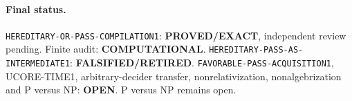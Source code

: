 \documentclass[11pt]{article}
\newcommand{\EXACT}{\textbf{PROVED/EXACT}}
\newcommand{\OPEN}{\textbf{OPEN}}
\newcommand{\RETIRED}{\textbf{FALSIFIED/RETIRED}}
\newcommand{\COMP}{\textbf{COMPUTATIONAL}}
\begin{document}
\paragraph{Final status.}
\texttt{HEREDITARY-OR-PASS-COMPILATION1}: \EXACT, independent review pending.
Finite audit: \COMP.
\texttt{HEREDITARY-PASS-AS-INTERMEDIATE1}: \RETIRED.
\texttt{FAVORABLE-PASS-ACQUISITION1}, UCORE-TIME1, arbitrary-decider
transfer, nonrelativization, nonalgebrization and P versus NP: \OPEN.
P versus NP remains open.

\end{document}
